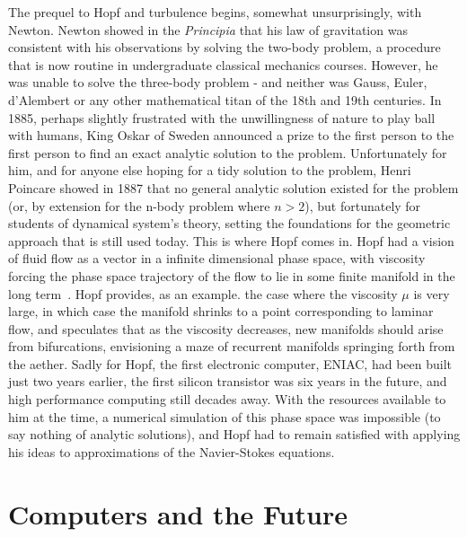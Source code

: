 The prequel to Hopf and turbulence begins, somewhat unsurprisingly, with Newton. Newton showed in the \emph{Principia} that his law of gravitation was consistent with his observations by solving the two-body problem, a procedure that is now routine in undergraduate classical mechanics courses. However, he was unable to solve the three-body problem - and neither was Gauss, Euler, d'Alembert or any other mathematical titan of the 18th and 19th centuries. In 1885, perhaps slightly frustrated with the unwillingness of nature to play ball with humans, King Oskar of Sweden announced a prize to the first person to the first person to find an exact analytic solution to the problem. Unfortunately for him, and for anyone else hoping for a tidy solution to the problem, Henri Poincare showed in 1887 that no general analytic solution existed for the problem (or, by extension for the n-body problem where $n>2$), but fortunately for students of dynamical system's theory, setting the foundations for the geometric approach that is still used today. This is where Hopf comes in. Hopf had a vision of fluid flow as a vector in a infinite dimensional phase space, with viscosity forcing the phase space trajectory of the flow to lie in some finite manifold in the long term~\cite{Hopf1948}. Hopf provides, as an example. the case where the viscosity $\mu$ is very large, in which case the manifold shrinks to a point corresponding to laminar flow, and speculates that as the viscosity decreases, new manifolds should arise from bifurcations, envisioning a maze of recurrent manifolds springing forth from the aether. Sadly for Hopf, the first electronic computer, ENIAC, had been built just two years earlier, the first silicon transistor was six years in the future, and high performance computing still decades away. With the resources available to him at the time, a numerical simulation of this phase space was impossible (to say nothing of analytic solutions), and Hopf had to remain satisfied with applying his ideas to approximations of the Navier-Stokes equations. \\

	\section{Computers and the Future}
	
